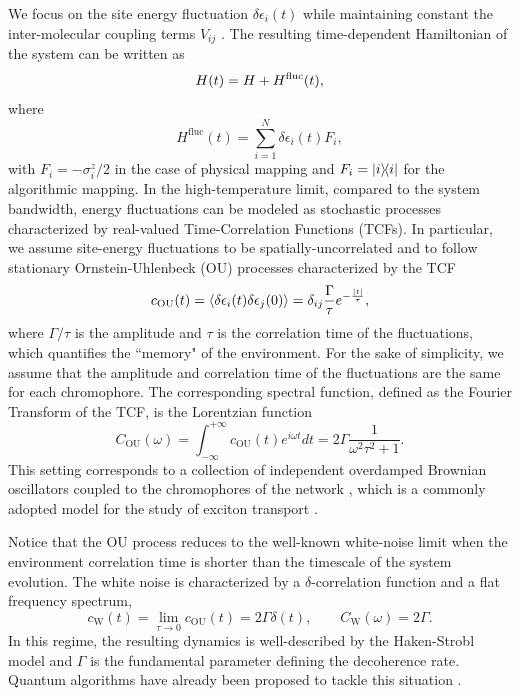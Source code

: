 \documentclass[12pt, amsmath, amssymb, graphicx]{iopart}
\begin{document}
We focus on the site energy fluctuation $\delta \epsilon_{i}(t)$ while maintaining constant the inter-molecular coupling terms $V_{ij}$ \cite{Cui2021}.
The resulting time-dependent Hamiltonian of the system can be written as
%
\begin{equation}{\label{eq:stochastic_Hamiltonian}}
    H(t) = H + H^{\text{fluc}}(t),
\end{equation}
%
where
%
\begin{equation}
    H^{\text{fluc}}(t) = \sum_{i = 1}^{N} \delta \epsilon_{i}(t) F_{i},
\end{equation}
%
with $F_{i} = - \sigma^{z}_{i}/2$ in the case of physical mapping and $F_{i} = \ketbra{i}{i}$ for the algorithmic mapping. In the high\hyphen temperature limit, compared to the system bandwidth, energy fluctuations can be modeled as stochastic processes characterized by real-valued Time\hyphen Correlation Functions (TCFs). In particular, we assume site-energy fluctuations to be spatially\hyphen uncorrelated and to follow stationary Ornstein\hyphen Uhlenbeck (OU) processes characterized by the TCF
%
\begin{equation}{\label{eq:Ornstein-Uhlenbeck}}
    c_{\text{OU}}(t) = \left\langle 
\delta \epsilon_{i}(t) \delta \epsilon_{j}(0) \right\rangle = \delta_{ij} \frac{\Gamma}{\tau} e^{-\frac{\abs{t}}{\tau}},
\end{equation}
%
where $\Gamma/\tau$ is the amplitude and $\tau$ is the correlation time of the fluctuations, which quantifies the ``memory" of the environment. For the sake of simplicity, we assume that the amplitude and correlation time of the fluctuations are the same for each chromophore. The corresponding spectral function, defined as the Fourier Transform of the TCF, is the Lorentzian function
%
\begin{equation} \label{eq:lorentzian_SF}
    C_{\text{OU}}(\omega) = \int_{-\infty}^{+\infty} c_{\text{OU}}(t)e^{i \omega t} dt = 2 \Gamma \frac{1}{\omega^{2} \tau^{2} + 1}.
\end{equation}
%
This setting corresponds to a collection of independent overdamped Brownian oscillators coupled to the chromophores of the network \cite{Mukamel1995}, which is a commonly adopted model for the study of exciton transport \cite{Dijkstra2015,Bondarenko2020,Fujita2012,Fujita2014}. 

Notice that the OU process reduces to the well-known white-noise limit when the environment correlation time is shorter than the timescale of the system evolution.
The white noise is characterized by a $\delta$-correlation function and a flat frequency spectrum,
%
\begin{equation}
    c_{\text{W}}(t) = \lim_{\tau\rightarrow 0} c_{\text{OU}}(t) = 2 \Gamma \delta(t), \qquad C_{\text{W}}(\omega) = 2 \Gamma.
\end{equation}
%
In this regime, the resulting dynamics is well-described by the Haken-Strobl model \cite{Haken1973} and $\Gamma$ is the fundamental parameter defining the decoherence rate.
Quantum algorithms have already been proposed to tackle this situation \cite{Gallina2022,Hu2021}.
\end{document}
